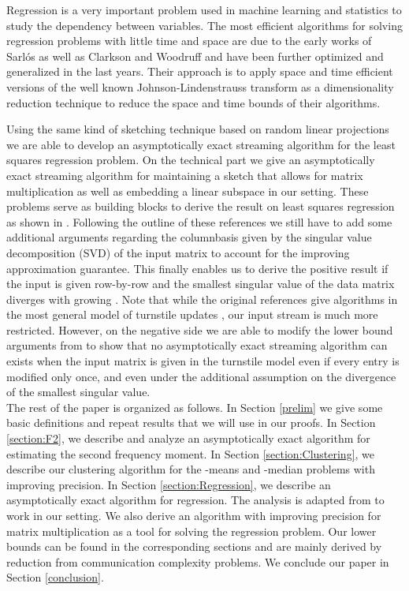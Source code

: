 \documentclass[a4paper,11pt,oneside,english,onecolumn]{article}
\theoremstyle{definition}
\begin{document}
Regression is a very important problem used in machine learning and statistics to study the dependency between variables. The most efficient algorithms for solving regression problems with little time and space are due to the early works of Sarl\'os \cite{ImpLinAlg} as well as Clarkson and Woodruff \cite{LinAlgStream} and have been further optimized and generalized in the last years. Their approach is to apply space and time efficient versions of the well known Johnson-Lindenstrauss transform \cite{JLT} as a dimensionality reduction technique to reduce the space and time bounds of their algorithms.

Using the same kind of sketching technique based on random linear projections we are able to develop an asymptotically exact streaming algorithm for the least squares regression problem. On the technical part we give an asymptotically exact streaming algorithm for maintaining a sketch that allows for matrix multiplication as well as embedding a linear subspace in our setting. These problems serve as building blocks to derive the result on least squares regression as shown in \cite{ImpLinAlg,LinAlgStream}. Following the outline of these references we still have to add some additional arguments regarding the columnbasis given by the singular value decomposition (SVD) of the input matrix to account for the improving approximation guarantee. This finally enables us to derive the positive result if the input is given row-by-row and the smallest singular value of the data matrix diverges with growing . Note that while the original references give algorithms in the most general model of turnstile updates \cite{Muthukrishnan05}, our input stream is much more restricted. However, on the negative side we are able to modify the lower bound arguments from \cite{LinAlgStream} to show that no asymptotically exact streaming algorithm can exists when the input matrix is given in the turnstile model even if every entry is modified only once, and
even under the additional assumption on the divergence of the smallest singular value.\\

The rest of the paper is organized as follows. In Section \ref{prelim} we give some basic definitions and repeat results that we will use in our proofs. In Section \ref{section:F2}, we describe and analyze an asymptotically exact algorithm for estimating the second frequency moment. In Section \ref{section:Clustering}, we describe our clustering algorithm for the -means and -median problems with improving precision. In Section \ref{section:Regression}, we describe an asymptotically exact algorithm for regression. The analysis is adapted from \cite{LinAlgStream} to work in our setting. We also derive an algorithm with improving precision for matrix multiplication as a tool for solving the regression problem. Our lower bounds can be found in the corresponding sections and are mainly derived by reduction from communication complexity problems. We conclude our paper in Section \ref{conclusion}.
\end{document}
